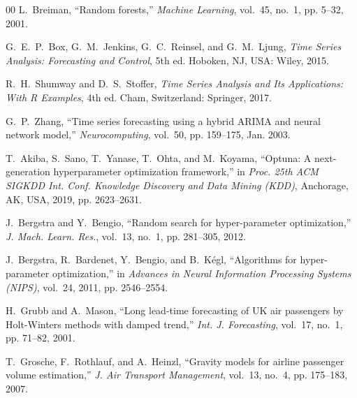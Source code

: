 \documentclass[12pt, a4paper]{article}
\begin{document}
\begin{thebibliography}{00}
L.~Breiman,
``Random forests,''
\textit{Machine Learning}, vol.~45, no.~1, pp. 5--32, 2001.

G.~E.~P.~Box, G.~M.~Jenkins, G.~C.~Reinsel, and G.~M.~Ljung,
\textit{Time Series Analysis: Forecasting and Control}, 5th ed.
Hoboken, NJ, USA: Wiley, 2015.

R.~H.~Shumway and D.~S.~Stoffer,
\textit{Time Series Analysis and Its Applications: With R Examples}, 4th ed.
Cham, Switzerland: Springer, 2017.

G.~P.~Zhang,
``Time series forecasting using a hybrid ARIMA and neural network model,''
\textit{Neurocomputing}, vol.~50, pp. 159--175, Jan. 2003.

T.~Akiba, S.~Sano, T.~Yanase, T.~Ohta, and M.~Koyama,
``Optuna: A next-generation hyperparameter optimization framework,''
in \textit{Proc. 25th ACM SIGKDD Int. Conf. Knowledge Discovery and Data
Mining (KDD)}, Anchorage, AK, USA, 2019, pp. 2623--2631.

J.~Bergstra and Y.~Bengio,
``Random search for hyper-parameter optimization,''
\textit{J. Mach. Learn. Res.}, vol.~13, no.~1, pp. 281--305, 2012.

J.~Bergstra, R.~Bardenet, Y.~Bengio, and B.~K\'{e}gl,
``Algorithms for hyper-parameter optimization,''
in \textit{Advances in Neural Information Processing Systems (NIPS)},
vol.~24, 2011, pp. 2546--2554.

H.~Grubb and A.~Mason,
``Long lead-time forecasting of UK air passengers by Holt-Winters methods
with damped trend,''
\textit{Int. J. Forecasting}, vol.~17, no.~1, pp. 71--82, 2001.

T.~Grosche, F.~Rothlauf, and A.~Heinzl,
``Gravity models for airline passenger volume estimation,''
\textit{J. Air Transport Management}, vol.~13, no.~4, pp. 175--183, 2007.

\end{thebibliography}
\end{document}
